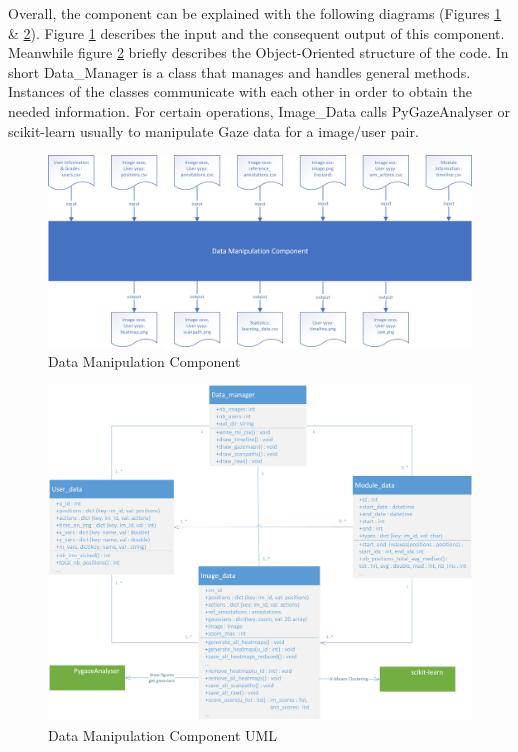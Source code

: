 \documentclass[a4paper,11pt]{report}
\numberwithin{figure}{chapter} %
\begin{document}
    Overall, the component can be explained with the following diagrams (Figures \ref{fig:comp2} \& \ref{fig:comp2uml}).
    Figure \ref{fig:comp2} describes the input and the consequent output of this component.
    Meanwhile figure \ref{fig:comp2uml} briefly describes the Object-Oriented structure of the code.
    In short Data\_Manager is a class that manages and handles general methods.
    Instances of the classes communicate with each other in order to obtain the needed information.
    For certain operations, Image\_Data calls PyGazeAnalyser or scikit-learn usually to manipulate Gaze data for a image/user pair.

    \begin{figure}[H]
      \centering
      \includegraphics[width=.9\linewidth]{diagrams/module2.png}
      \caption{Data Manipulation Component}
      \label{fig:comp2}
    \end{figure}

    \begin{figure}[H]
      \centering
      \includegraphics[width=.9\linewidth]{diagrams/module2uml.png}
      \caption{Data Manipulation Component UML}
      \label{fig:comp2uml}
    \end{figure}
\end{document}
